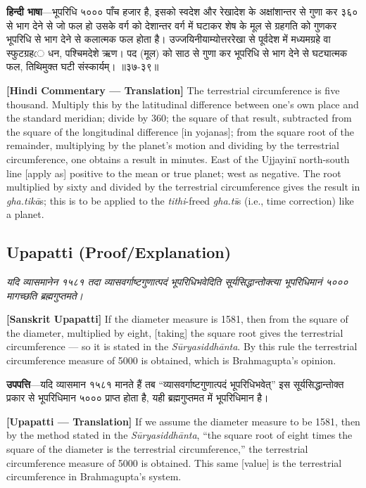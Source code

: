 \documentclass[11pt,a4paper]{book}
\newcommand{\dev}[1]{{\devanagarifont #1}}
\newcommand{\sktcommbilingual}[2]{%
  \par\vspace{0.5em}%
  \noindent\begin{minipage}[t]{0.48\textwidth}
    \RaggedRight\small\itshape
    \dev{#1}
  \end{minipage}%
  \hfill
  \begin{minipage}[t]{0.48\textwidth}
    \RaggedRight\small
    #2%
  \end{minipage}%
  \par\vspace{0.5em}%
}
\newcommand{\hindicommbilingual}[2]{%
  \par\vspace{0.5em}%
  \noindent\begin{minipage}[t]{0.48\textwidth}
    \RaggedRight\small
    \dev{#1}
  \end{minipage}%
  \hfill
  \begin{minipage}[t]{0.48\textwidth}
    \RaggedRight\small
    #2%
  \end{minipage}%
  \par\vspace{0.5em}%
}
\begin{document}
\hindicommbilingual{%
\textbf{हिन्दी भाषा}---भूपरिधि ५००० पाँच हजार है, इसको स्वदेश और रेखादेश के अक्षांशान्तर से गुणा कर ३६० से भाग देने से जो फल हो उसके वर्ग को देशान्तर वर्ग में घटाकर शेष के मूल से ग्रहगति को गुणकर भूपरिधि से भाग देने से कलात्मक फल होता है। उज्जयिनीयाम्योत्तररेखा से पूर्वदेश में मध्यमग्रहे वा स्फुटग्रहে धन, पश्चिमदेशे ऋण। पद (मूल) को साठ से गुणा कर भूपरिधि से भाग देने से घट्यात्मक फल, तिथिमुक्त घटी संस्कार्यम्‌। ॥३७-३९॥
}{%
\textbf{[Hindi Commentary --- Translation]} The terrestrial circumference is five thousand. Multiply this by the latitudinal difference between one's own place and the standard meridian; divide by 360; the square of that result, subtracted from the square of the longitudinal difference [in yojanas]; from the square root of the remainder, multiplying by the planet's motion and dividing by the terrestrial circumference, one obtains a result in minutes. East of the Ujjayinī north-south line [apply as] positive to the mean or true planet; west as negative. The root multiplied by sixty and divided by the terrestrial circumference gives the result in \textit{gha.tikā}s; this is to be applied to the \textit{tithi}-freed \textit{gha.tī}s (i.e., time correction) like a planet.
}

\subsection*{Upapatti (Proof/Explanation)}

\sktcommbilingual{%
यदि व्यासमानेन १५८१ तदा व्यासवर्गाष्टगुणात्पदं भूपरिधिभवेदिति सूर्यसिद्धान्तोक्त्या भूपरिधिमानं ५००० मागच्छति ब्रह्मगुप्तमते।
}{%
\textbf{[Sanskrit Upapatti]} If the diameter measure is 1581, then from the square of the diameter, multiplied by eight, [taking] the square root gives the terrestrial circumference --- so it is stated in the \textit{Sūryasiddhānta}. By this rule the terrestrial circumference measure of 5000 is obtained, which is Brahmagupta's opinion.
}

\hindicommbilingual{%
\textbf{उपपत्ति}---यदि व्यासमान १५८१ मानते हैं तब ``व्यासवर्गाष्टगुणात्पदं भूपरिधिभवेत्‌'' इस सूर्यसिद्धान्तोक्त प्रकार से भूपरिधिमान ५००० प्राप्त होता है, यही ब्रह्मगुप्तमत में भूपरिधिमान है।
}{%
\textbf{[Upapatti --- Translation]} If we assume the diameter measure to be 1581, then by the method stated in the \textit{Sūryasiddhānta}, ``the square root of eight times the square of the diameter is the terrestrial circumference,'' the terrestrial circumference measure of 5000 is obtained. This same [value] is the terrestrial circumference in Brahmagupta's system.
}
\end{document}
